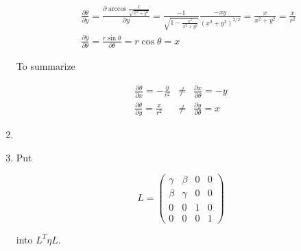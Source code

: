 \documentclass[12pt,a4paper]{article}
\begin{document}
\begin{enumerate}
\begin{eqnarray*}
&& \frac{ \partial \theta }{ \partial y } = \frac{ \partial\arccos{\frac{x}{\sqrt{x^2+y^2}} } }{ \partial y } = \frac{-1}{\sqrt{1 - \frac{x^2}{x^2+y^2} }} \frac{-xy}{(x^2+y^2)^{3/2}} = \frac{x}{x^2+y^2} = \frac{x}{r^2} \\
&& \frac{ \partial y }{ \partial \theta } = \frac{ r\sin\theta }{ \partial \theta } = r\cos\theta = x
\end{eqnarray*}

To summarize

\begin{eqnarray}
\frac{\partial \theta}{\partial x} =-\frac{y}{r^2} &\neq& \frac{\partial x}{\partial\theta} = -y \\
\frac{\partial \theta}{\partial y} = \frac{x}{r^2} &\neq& \frac{\partial y}{\partial\theta} =  x
\end{eqnarray}



\item



\item

Put 

\begin{equation}
L =  
	\begin{pmatrix}
\gamma & \beta & 0 & 0 \\
\beta & \gamma & 0  & 0 \\
0 & 0 & 1 & 0 \\
0 & 0 & 0 & 1
	\end{pmatrix}
\end{equation}

into $L^T \eta L$.


\end{enumerate}
\end{document}
